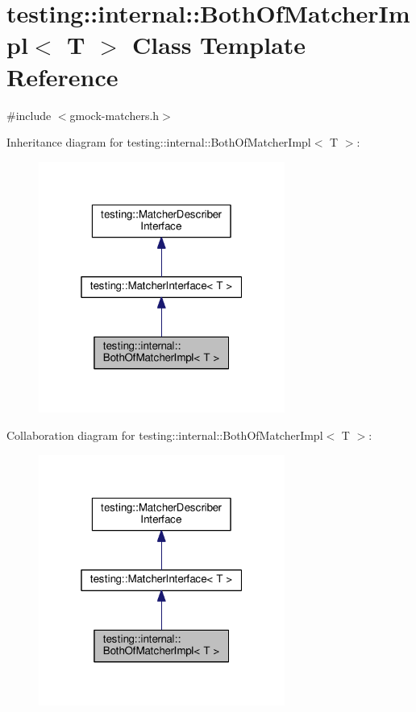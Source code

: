 \hypertarget{classtesting_1_1internal_1_1BothOfMatcherImpl}{}\section{testing\+:\+:internal\+:\+:Both\+Of\+Matcher\+Impl$<$ T $>$ Class Template Reference}
\label{classtesting_1_1internal_1_1BothOfMatcherImpl}


{\ttfamily \#include $<$gmock-\/matchers.\+h$>$}



Inheritance diagram for testing\+:\+:internal\+:\+:Both\+Of\+Matcher\+Impl$<$ T $>$\+:
\nopagebreak
\begin{figure}[H]
\begin{center}
\leavevmode
\includegraphics[width=229pt]{classtesting_1_1internal_1_1BothOfMatcherImpl__inherit__graph}
\end{center}
\end{figure}


Collaboration diagram for testing\+:\+:internal\+:\+:Both\+Of\+Matcher\+Impl$<$ T $>$\+:
\nopagebreak
\begin{figure}[H]
\begin{center}
\leavevmode
\includegraphics[width=229pt]{classtesting_1_1internal_1_1BothOfMatcherImpl__coll__graph}
\end{center}
\end{figure}
